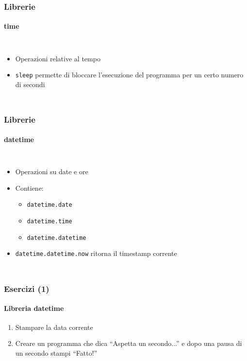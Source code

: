 \begin{contentframe}
    \frametitle{Librerie}
    \framesubtitle{time}

    \begin{columns}
        \begin{itemize}
            \item Operazioni relative al tempo
            \bigskip
            \item \texttt{sleep} permette di bloccare l'esecuzione del programma per un certo numero di secondi
        \end{itemize}
        
        \centering
    \end{columns}
\end{contentframe}

\begin{contentframe}
    \frametitle{Librerie}
    \framesubtitle{datetime}

    \begin{columns}
        \begin{itemize}
            \item Operazioni su date e ore
            \bigskip
            \item Contiene:
            \begin{itemize}
                \item \texttt{datetime.date}
                \item \texttt{datetime.time}
                \item \texttt{datetime.datetime}
            \end{itemize}
            \bigskip
            \item \texttt{datetime.datetime.now} ritorna il timestamp corrente 
        \end{itemize}
        
        \centering
    \end{columns}
\end{contentframe}

\begin{exerciseframe}
    \frametitle{Esercizi (1)}
    \framesubtitle{Libreria datetime}

    \begin{enumerate}
        \item Stampare la data corrente
    
        \pause
        \bigskip
        \item Creare un programma che dica ``Aspetta un secondo...'' e dopo una pausa di un secondo stampi ``Fatto!''
    \end{enumerate}
\end{exerciseframe}

